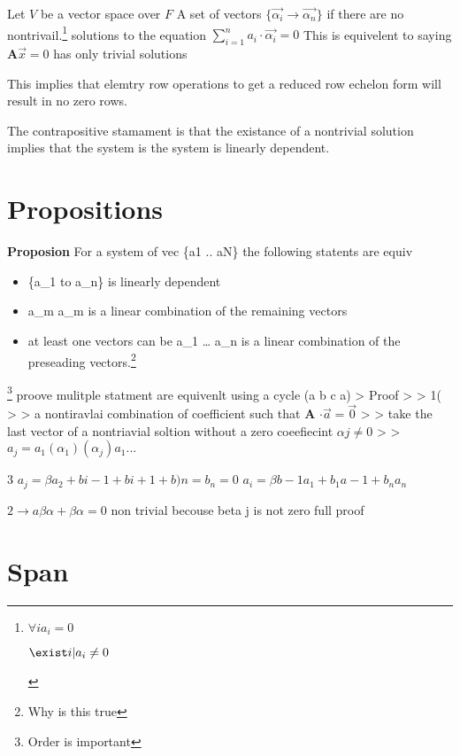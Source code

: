 \documentclass{tufte-handout}
\providecommand{\tightlist}{%
  \setlength{\itemsep}{0pt}\setlength{\parskip}{0pt}}
\begin{document}
Let \(V\) be a vector space over \(F\) A set of vectors
\(\{\vec{\alpha _i} \to \vec{\alpha _n}\}\) if there are no
nontrivail.\footnote{\begin{description}
  \tightlist
  \item[trivial]
  \(\forall i a_i = 0\)
  \item[nontrivial]
  \(\exist i | a_i \neq 0\)
  \end{description}} solutions to the equation
\(\sum_{i=1}^n a_i \cdot \vec{\alpha_i}=0\) This is equivelent to saying
\(\mathbf{A}\vec{x}= 0\) has only trivial solutions

This implies that elemtry row operations to get a reduced row echelon
form will result in no zero rows.

The contrapositive stamament is that the existance of a nontrivial
solution implies that the system is the system is linearly dependent.\hypertarget{propositions}{%
\section{Propositions}\label{propositions}}

\textbf{Proposion} For a system of vec \{a1 .. aN\} the following
statents are equiv

\begin{itemize}
\tightlist
\item
  \{a\_1 to a\_n\} is linearly dependent
\item
  \exist a\_m \textbar{} a\_m is a linear combination of the remaining
  vectors
\item
  at least one vectors can be a\_1 \ldots{} a\_n is a linear combination
  of the preseading vectors.\footnote{Why is this true}
\end{itemize}

\footnote{Order is important} proove mulitple statment are equivenlt
using a cycle (a \to b \to c \to a) \textgreater{} Proof \textgreater{}
\textgreater{} 1(  \textgreater{} \textgreater{} \exists a
nontiravlai combination of coefficient such that \textbf{A}
\(\cdot \vec{a} = \vec{0}\) \textgreater{} \textgreater{} take the last
vector of a nontriavial soltion without a zero coeefiecint
\(\alpha j \neq 0\) \textgreater{} \textgreater{}
\(a_j = a_1(\alpha_1)(\alpha_j)a_1 ...\)

3  \(a_j = \beta a_2 + b i-1 + b i + 1 +b)n = b_n = 0\)
\(a_i = \beta b-1 a_1 + b_1 a-1 + b_n a_n\)

\(2 \to a \beta \alpha + \beta \alpha = 0\) non trivial becouse beta j
is not zero full proof\hypertarget{span}{%
\section{Span}\label{span}}
\end{document}
